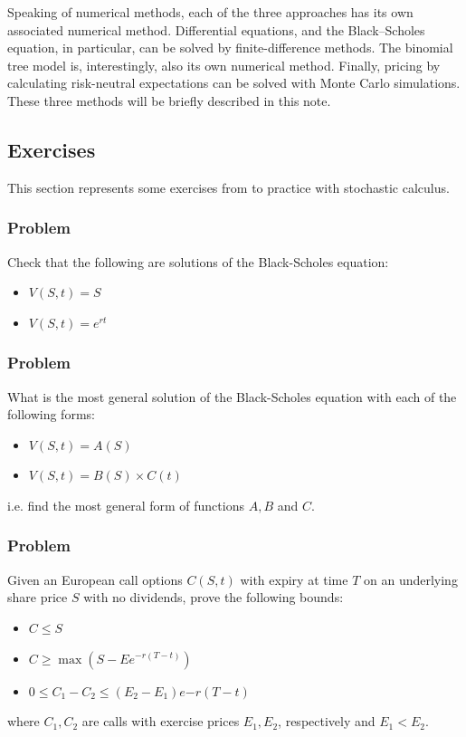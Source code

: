 Speaking of numerical methods, each of the three approaches has its own associated numerical method. Differential equations, and the Black–Scholes equation, in particular, can be solved by finite-difference methods. The binomial tree model is, interestingly, also its own numerical method. Finally, pricing by calculating risk-neutral expectations can be solved with Monte Carlo simulations. These three methods will be briefly described in this note.



\subsection{Exercises}
This section represents some exercises from \cite{pw_iqf2ed_2007} to practice with stochastic calculus.

\subsubsection{Problem}
Check that the following are solutions of the Black-Scholes equation:
\begin{itemize}
    \setlength\itemsep{0em}
    \item $V(S,t) = S$
    \item $V(S,t) = e^{rt}$
\end{itemize}


\subsubsection{Problem}
What is the most general solution of the Black-Scholes equation with each of the following forms:
\begin{itemize}
    \setlength\itemsep{0em}
    \item $V(S,t) = A(S)$
    \item $V(S,t) = B(S) \times C(t)$
\end{itemize}
i.e. find the most general form of functions $A, B$ and $C$.


\subsubsection{Problem}
Given an European call options $C(S,t)$ with expiry at time $T$ on an underlying share price $S$ with no dividends, prove the following bounds:
\begin{itemize}
    \setlength\itemsep{0em}
    \item $C \leq S$
    \item $C \geq \max(S-Ee^{-r(T-t)})$
    \item $0 \leq C_1 - C_2 \leq (E_2 - E_1) e{-r(T-t)}$
\end{itemize}
where $C_1, C_2$ are calls with exercise prices $E_1, E_2$, respectively and $E_1 < E_2$.


